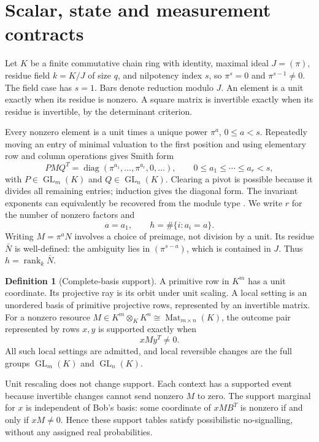 \documentclass[11pt]{article}
\theoremstyle{definition}\newtheorem{definition}[theorem]{Definition}
\theoremstyle{remark}\newtheorem{remark}[theorem]{Remark}
\DeclareMathOperator{\GL}{GL}
\DeclareMathOperator{\Mat}{Mat}
\DeclareMathOperator{\rank}{rank}
\DeclareMathOperator{\diag}{diag}
\begin{document}
\section{Scalar, state and measurement contracts}\label{sec:contract}
Let $K$ be a finite commutative chain ring with identity, maximal ideal $J=(\pi)$, residue field $k=K/J$ of size $q$, and nilpotency index $s$, so $\pi^s=0$ and $\pi^{s-1}\ne0$. The field case has $s=1$. Bars denote reduction modulo $J$. An element is a unit exactly when its residue is nonzero. A square matrix is invertible exactly when its residue is invertible, by the determinant criterion.

Every nonzero element is a unit times a unique power $\pi^a$, $0\leq a<s$. Repeatedly moving an entry of minimal valuation to the first position and using elementary row and column operations gives Smith form
\[
 PMQ^T=\diag(\pi^{a_1},\ldots,\pi^{a_r},0,\ldots),\qquad
 0\leq a_1\leq\cdots\leq a_r<s,
\]
with $P\in\GL_m(K)$ and $Q\in\GL_n(K)$. Clearing a pivot is possible because it divides all remaining entries; induction gives the diagonal form. The invariant exponents can equivalently be recovered from the module type \cite{Byrne2021}. We write $r$ for the number of nonzero factors and
\[
 a=a_1,\qquad h=\#\{i:a_i=a\}.
\]
Writing $M=\pi^a N$ involves a choice of preimage, not division by a unit. Its residue $\bar N$ is well-defined: the ambiguity lies in $(\pi^{s-a})$, which is contained in $J$. Thus $h=\rank_k\bar N$.

\begin{definition}[Complete-basis support]
A primitive row in $K^m$ has a unit coordinate. Its projective ray is its orbit under unit scaling. A local setting is an unordered basis of primitive projective rows, represented by an invertible matrix. For a nonzero resource $M\in K^m\otimes_K K^n\cong\Mat_{m\times n}(K)$, the outcome pair represented by rows $x,y$ is supported exactly when
\[
 xMy^T\ne0.
\]
All such local settings are admitted, and local reversible changes are the full groups $\GL_m(K)$ and $\GL_n(K)$.
\end{definition}

Unit rescaling does not change support. Each context has a supported event because invertible changes cannot send nonzero $M$ to zero. The support marginal for $x$ is independent of Bob's basis: some coordinate of $xMB^T$ is nonzero if and only if $xM\ne0$. Hence these support tables satisfy possibilistic no-signalling, without any assigned real probabilities.
\end{document}
